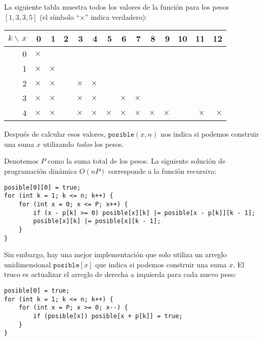 La siguiente tabla muestra todos los valores de la función
para los pesos $[1,3,3,5]$ (el símbolo ``$\times$'' indica verdadero):

\begin{center}
    \begin{tabular}{r|rrrrrrrrrrrrr}
        $k \backslash\, x$ & 0        & 1        & 2 & 3        & 4        & 5        & 6        & 7        & 8        & 9        & 10 & 11       & 12       \\
        \hline
        0                  & $\times$ &                                                                                                                      \\
        1                  & $\times$ & $\times$                                                                                                             \\
        2                  & $\times$ & $\times$ &   & $\times$ & $\times$                                                                                   \\
        3                  & $\times$ & $\times$ &   & $\times$ & $\times$ &          & $\times$ & $\times$                                                  \\
        4                  & $\times$ & $\times$ &   & $\times$ & $\times$ & $\times$ & $\times$ & $\times$ & $\times$ & $\times$ &    & $\times$ & $\times$ \\
    \end{tabular}
\end{center}

Después de calcular esos valores, $\texttt{posible}(x,n)$
nos indica si podemos construir una
suma $x$ utilizando \emph{todos} los pesos.

Denotemos $P$ como la suma total de los pesos.
La siguiente solución de programación dinámica $O(nP)$
corresponde a la función recursiva:
\begin{lstlisting}
posible[0][0] = true;
for (int k = 1; k <= n; k++) {
    for (int x = 0; x <= P; x++) {
        if (x - p[k] >= 0) posible[x][k] |= posible[x - p[k]][k - 1];
        posible[x][k] |= posible[x][k - 1];
    }
}
\end{lstlisting}

Sin embargo, hay una mejor implementación que solo utiliza
un arreglo unidimensional $\texttt{posible}[x]$
que indica si podemos construir una suma $x$.
El truco es actualizar el arreglo de derecha a izquierda para
cada nuevo peso:
\begin{lstlisting}
posible[0] = true;
for (int k = 1; k <= n; k++) {
    for (int x = P; x >= 0; x--) {
        if (posible[x]) posible[x + p[k]] = true;
    }
}
\end{lstlisting}

